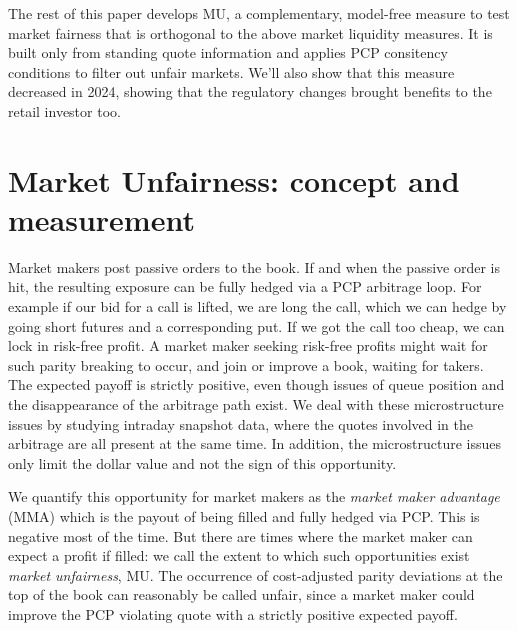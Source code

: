 \documentclass[12pt]{article}
\begin{document}
The rest of this paper develops MU, a complementary, model-free measure to test market fairness that is orthogonal to the above market liquidity measures. It is built only from standing quote information and applies PCP consitency conditions to filter out unfair markets. We'll also show that this measure decreased in 2024, showing that the regulatory changes brought benefits to the retail investor too.

\clearpage
\section{Market Unfairness: concept and measurement}
\label{sec:method}

Market makers post passive orders to the book. If and when the passive order is hit, the resulting exposure can be fully hedged via a PCP arbitrage loop. For example if our bid for a call is lifted, we are long the call, which we can hedge by going short futures and a corresponding put. If we got the call too cheap, we can lock in risk-free profit. A market maker seeking risk-free profits might wait for such parity breaking to occur, and join or improve a book, waiting for takers. The expected payoff is strictly positive, even though issues of queue position and the disappearance of the arbitrage path exist. We deal with these microstructure issues by studying intraday snapshot data, where the quotes involved in the arbitrage are all present at the same time. In addition, the microstructure issues only limit the dollar value and not the sign of this opportunity.

We quantify this opportunity for market makers as the \emph{market maker advantage} (MMA) which is the payout of being filled and fully hedged via PCP. This is negative most of the time. But there are times where the market maker can expect a profit if filled:  we call the extent to which such opportunities exist \emph{market unfairness}, MU. The occurrence of cost-adjusted parity deviations at the top of the book can reasonably be called unfair, since a market maker could improve the PCP violating quote with a strictly positive expected payoff. 
\end{document}
